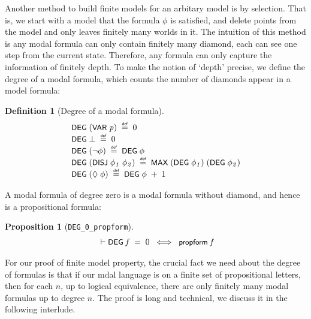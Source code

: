 \documentclass[letterpaper]{article}
\newtheorem{defn}{Definition}
\newtheorem{prop}{Proposition}
\renewcommand{\HOLConst}[1]{{\textsf{\upshape\small #1}}}
\newenvironment{holmath}{\begin{displaymath}\begin{array}{l}}{\end{array}\end{displaymath}\ignorespacesafterend}
\begin{document}
Another method to build finite models for an arbitary model is by selection. That is, we start with a model that the formula $\phi$ is satisfied, and delete points from the model and only leaves finitely many worlds in it. The intuition of this method is any modal formula can only contain finitely many diamond, each can see one step from the current state. Therefore, any formula can only capture the information of finitely depth. To make the notion of `depth' precise, we define the degree of a modal formula, which counts the number of diamonds appear in a model formula:
\begin{defn}[Degree of a modal formula]
\begin{holmath}
  \HOLConst{DEG}\;(\HOLConst{VAR}\;\HOLFreeVar{p})\;\HOLSymConst{\HOLTokenDefEquality{}}\;\HOLNumLit{0}\\
\HOLConst{DEG}\;\HOLSymConst{\ensuremath{\bot}}\;\HOLSymConst{\HOLTokenDefEquality{}}\;\HOLNumLit{0}\\
\HOLConst{DEG}\;(\HOLSymConst{\HOLTokenNeg{}}\HOLFreeVar{\ensuremath{\phi}})\;\HOLSymConst{\HOLTokenDefEquality{}}\;\HOLConst{DEG}\;\HOLFreeVar{\ensuremath{\phi}}\\
\HOLConst{DEG}\;(\HOLConst{DISJ}\;\HOLFreeVar{\ensuremath{\phi\sb{1}}}\;\HOLFreeVar{\ensuremath{\phi\sb{2}}})\;\HOLSymConst{\HOLTokenDefEquality{}}\;\HOLConst{MAX}\;(\HOLConst{DEG}\;\HOLFreeVar{\ensuremath{\phi\sb{1}}})\;(\HOLConst{DEG}\;\HOLFreeVar{\ensuremath{\phi\sb{2}}})\\
\HOLConst{DEG}\;(\HOLSymConst{\ensuremath{\Diamond}}\;\HOLFreeVar{\ensuremath{\phi}})\;\HOLSymConst{\HOLTokenDefEquality{}}\;\HOLConst{DEG}\;\HOLFreeVar{\ensuremath{\phi}}\;\HOLSymConst{\ensuremath{+}}\;\HOLNumLit{1}
\end{holmath}
\end{defn}
A modal formula of degree zero is a modal formula without diamond, and hence is a propositional formula:

\begin{prop}[\texttt{DEG_0_propform}]
\begin{holmath}
  \ensuremath{\HOLTokenTurnstile}\HOLConst{DEG}\;\HOLFreeVar{f}\;\HOLSymConst{=}\;\HOLNumLit{0}\;\HOLSymConst{\HOLTokenEquiv{}}\;\HOLConst{propform}\;\HOLFreeVar{f}
\end{holmath}
\end{prop}

For our proof of finite model property, the crucial fact we need about the degree of formulas is that if our mdal language is on a finite set of propositional letters, then for each $n$, up to logical equivalence, there are only finitely many modal formulas up to degree $n$. The proof is long and technical, we discuss it in the following interlude.
\end{document}
